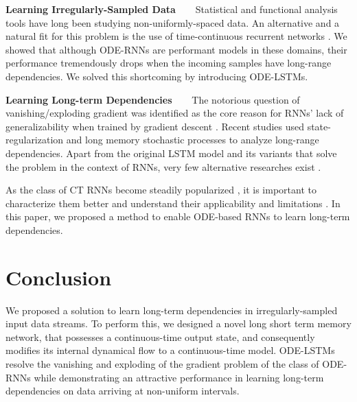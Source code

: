 \documentclass{article}
\begin{document}
\textbf{Learning Irregularly-Sampled Data~~~} Statistical \cite{pearson2003imbalanced,li2016scalable,belletti2016scalable,roy2020robust} and functional analysis \cite{foster1996wavelets,amigo2012transcripts,kowal2019functional} tools have long been studying non-uniformly-spaced data. An alternative and a natural fit for this problem is the use of time-continuous recurrent networks \cite{rubanova2019latent}. We showed that although ODE-RNNs are performant models in these domains, their performance tremendously drops when the incoming samples have long-range dependencies. We solved this shortcoming by introducing ODE-LSTMs. 

\textbf{Learning Long-term Dependencies~~~} The notorious question of vanishing/exploding gradient \cite{hochreiter1991untersuchungen,bengio1994learning} was identified as the core reason for RNNs' lack of generalizability when trained by gradient descent \cite{allen2019can,sherstinsky2020fundamentals}. Recent studies used state-regularization \cite{wang2019state} and long memory stochastic processes \cite{greaves2019statistical} to analyze long-range dependencies. Apart from the original LSTM model \cite{hochreiter1997long} and its variants \cite{greff2016lstm} that solve the problem in the context of RNNs, very few alternative researches exist \cite{chen2019recurrent}. 

As the class of CT RNNs become steadily popularized \cite{hasani2020liquid,lechner2020neural}, it is important to characterize them better \cite{lechner2019designing,dupont2019augmented,durkan2019neural} and understand their applicability and limitations \cite{jia2019neural,lechner2020gershgorin,hanshu2020robustness,holl2020learning,quaglino2020snode,kidger2020neural,hasani2020natural}. In this paper, we proposed a method to enable ODE-based RNNs to learn long-term dependencies.


\section{Conclusion}
We proposed a solution to learn long-term dependencies in irregularly-sampled input data streams. To perform this, we designed a novel long short term memory network, that possesses a continuous-time output state, and consequently modifies its internal dynamical flow to a continuous-time model. ODE-LSTMs resolve the vanishing and exploding of the gradient problem of the class of ODE-RNNs while demonstrating an attractive performance in learning long-term dependencies on data arriving at non-uniform intervals. 
\end{document}
